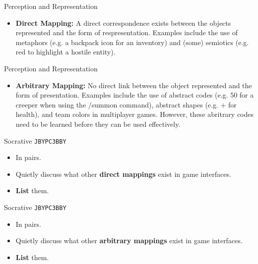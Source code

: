 \begin{frame}{Perception and Representation}
	\begin{itemize}
		\item \textbf{Direct Mapping:} A direct correspondence exists between the objects represented and the form of respresentation. Examples include
		the use of metaphors (e.g. a backpack icon for an inventory) and (some) semiotics (e.g. red to highlight a hostile entity).
	\end{itemize}
\end{frame}

\begin{frame}{Perception and Representation}
	\begin{itemize}
		\item \textbf{Arbitrary Mapping:} No direct link between the object represented and the form of presentation. Examples include the use of abstract
		codes (e.g. 50 for a creeper when using the /summon command), abstract shapes (e.g. $+$ for health), and team colors in multiplayer games. However,
		these abritrary codes need to be learned before they can be used effectively.
	\end{itemize}
\end{frame}

\begin{frame}[fragile]{Socrative \texttt{JBYPC3BBY}}
	\begin{itemize}
		\item In pairs.
		\item Quietly discuss what other \textbf{direct mappings} exist in game interfaces.
		\item \textbf{List} them.
	\end{itemize}
\end{frame}

\begin{frame}[fragile]{Socrative \texttt{JBYPC3BBY}}
	\begin{itemize}
		\item In pairs.
		\item Quietly discuss what other \textbf{arbitrary mappings} exist in game interfaces.
		\item \textbf{List} them.
	\end{itemize}
\end{frame}

